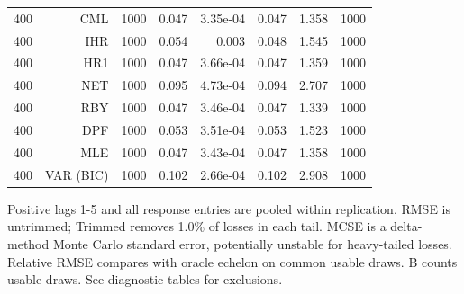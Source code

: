 \begin{table}[p]
\begin{tabular}{rrrrrrrr}
400 & CML & 1000 & 0.047 & 3.35e-04 & 0.047 & 1.358 & 1000 \\
400 & IHR & 1000 & 0.054 & 0.003 & 0.048 & 1.545 & 1000 \\
400 & HR1 & 1000 & 0.047 & 3.66e-04 & 0.047 & 1.359 & 1000 \\
400 & NET & 1000 & 0.095 & 4.73e-04 & 0.094 & 2.707 & 1000 \\
400 & RBY & 1000 & 0.047 & 3.46e-04 & 0.047 & 1.339 & 1000 \\
400 & DPF & 1000 & 0.053 & 3.51e-04 & 0.053 & 1.523 & 1000 \\
400 & MLE & 1000 & 0.047 & 3.43e-04 & 0.047 & 1.358 & 1000 \\
400 & VAR (BIC) & 1000 & 0.102 & 2.66e-04 & 0.102 & 2.908 & 1000 \\
\bottomrule\end{tabular}
\par\medskip
\begin{minipage}{0.98\linewidth}\footnotesize Positive lags 1-5 and all response entries are pooled within replication. RMSE is untrimmed; Trimmed removes 1.0\% of losses in each tail. MCSE is a delta-method Monte Carlo standard error, potentially unstable for heavy-tailed losses. Relative RMSE compares with oracle echelon on common usable draws. B counts usable draws. See diagnostic tables for exclusions.\end{minipage}
\end{table}
